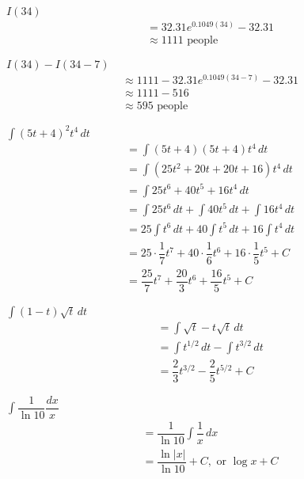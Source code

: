 \documentclass[12pt]{article}
\newenvironment{problem}[2][]{
    \begin{trivlist}
        \item[
            {\bfseries #1}
            {\bfseries #2.}
        ]
}{\end{trivlist}}
\begin{document}
\begin{problem}{c)}
$I(34)$
\begin{align}
&= 32.31e^{0.1049(34)} - 32.31 \\
&\approx 1111 \text{ people}
\end{align}
\end{problem}

\begin{problem}{d)}
$I(34) - I(34 - 7)$
\begin{align}
&\approx 1111 - 32.31e^{0.1049(34 - 7)} - 32.31 \\
&\approx 1111 - 516 \\
&\approx 595 \text{ people}
\end{align}
\end{problem}

\begin{problem}{73}
$\displaystyle\int (5t + 4)^2 t^4 \, dt$
\begin{align}
&= \int (5t + 4)(5t + 4)t^4 \, dt \\
&= \int (25t^2 + 20t + 20t + 16)t^4 \, dt \\
&= \int 25t^6 + 40t^5 + 16t^4 \, dt \\
&= \int 25t^6 \, dt + \int 40t^5 \, dt + \int 16t^4 \, dt \\
&= 25 \int t^6 \, dt + 40 \int t^5 \, dt + 16 \int t^4 \, dt \\
&= 25 \cdot \dfrac{1}{7} t^7 + 40 \cdot \dfrac{1}{6} t^6 + 16 \cdot \dfrac{1}{5} t^5 + C \\
&= \dfrac{25}{7} t^7 + \dfrac{20}{3} t^6 + \dfrac{16}{5} t^5 + C
\end{align}
\end{problem}

\begin{problem}{75}
$\displaystyle\int (1 - t) \sqrt{t} \, dt$
\begin{align}
&= \int \sqrt{t} - t \sqrt{t} \, dt \\
&= \int t^{1/2} \, dt - \int t^{3/2} \, dt \\
&= \dfrac{2}{3} t^{3/2} - \dfrac{2}{5} t^{5/2} + C
\end{align}
\end{problem}

\begin{problem}{79}
$\displaystyle\int \dfrac{1}{\ln{10}} \dfrac{dx}{x}$
\begin{align}
&= \dfrac{1}{\ln{10}} \int \dfrac{1}{x} \, dx \\
&= \dfrac{\ln{|x|}}{\ln{10}} + C, \text{ or } \log{x} + C
\end{align}
\end{problem}
\end{document}
